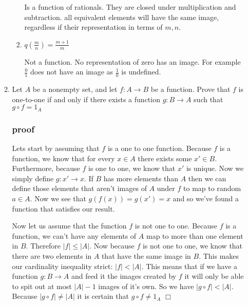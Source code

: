 \documentclass[letterpaper]{article}
\begin{document}
\begin{enumerate}
\begin{enumerate}
\begin{enumerate}
Is a function of rationals. They are closed under multiplication and subtraction. all equivalent elements will have the same image, regardless if their representation in terms of $m,n$.
\item
$\displaystyle q\left(\frac{m}{n}\right)=\frac{m+1}{m}$

Not a function. No representation of zero has an image. For example $\frac{0}{1}$ does not have an image as $\frac{1}{0}$ is undefined.
\end{enumerate}
\setcounter{enumii}{17}
\item
Let $A$ be a nonempty set, and let $f:A\to B$ be a function. Prove that $f$ is one-to-one if and only if there exists a function $g:B\to A$ such that $g\circ f=1_A$
\subsubsection*{proof}
Lets start by assuming that $f$ is a one to one function. Because $f$ is a function, we know that for every $x\in A$ there exists some $x'\in B$. Furthermore, because $f$ is one to one, we know that $x'$ is unique. Now we simply define $g:x'\to x$. If $B$ has more elements than $A$ then we can define those elements that aren't images of $A$ under $f$ to map to random $a\in A$. Now we see that $g(f(x))=g(x')=x$ and so we've found a function that satisfies our result.

Now let us assume that the function $f$ is not one to one. Because $f$ is a function, we can't have any elements of $A$ map to more than one element in $B$. Therefore $\left\lvert f\right\rvert\le \left\lvert A\right\rvert$. Now because $f$ is not one to one, we know that there are two elements in $A$ that have the same image in $B$. This makes our cardinality inequality strict: $\left\lvert f\right\rvert<\left\lvert A\right\rvert$. This means that if we have a function $g:B\to A$ and feed it the images created by $f$ it will only be able to spit out at most $\left\lvert A\right\rvert-1$ images of it's own. So we have $\left\lvert g\circ f\right\rvert<\left\lvert A\right\rvert$. Because $\left\lvert g\circ f\right\rvert\ne\left\lvert A\right\rvert$ it is certain that $g\circ f\ne1_A$
$\Box$
\end{enumerate}
\end{enumerate}
\end{document}
